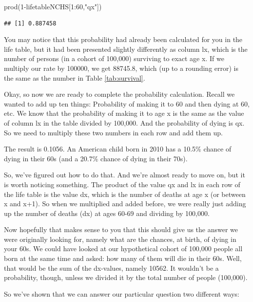 \documentclass[
  openany]{book}
\newenvironment{Shaded}{\begin{snugshade}}{\end{snugshade}}
\newcommand{\DecValTok}[1]{\textcolor[rgb]{0.00,0.00,0.81}{#1}}
\newcommand{\FunctionTok}[1]{\textcolor[rgb]{0.00,0.00,0.00}{#1}}
\newcommand{\NormalTok}[1]{#1}
\newcommand{\SpecialCharTok}[1]{\textcolor[rgb]{0.00,0.00,0.00}{#1}}
\newcommand{\StringTok}[1]{\textcolor[rgb]{0.31,0.60,0.02}{#1}}
\begin{document}
\begin{Shaded}
\begin{Highlighting}[]
\FunctionTok{prod}\NormalTok{(}\DecValTok{1}\SpecialCharTok{{-}}\NormalTok{lifetableNCHS[}\DecValTok{1}\SpecialCharTok{:}\DecValTok{60}\NormalTok{,}\StringTok{"qx"}\NormalTok{])}
\end{Highlighting}
\end{Shaded}

\begin{verbatim}
## [1] 0.887458
\end{verbatim}

You may notice that this probability had already been calculated for you in the life table, but it had been presented slightly differently as column lx, which is the number of persons (in a cohort of 100,000) surviving to exact age x. If we multiply our rate by 100000, we get 88745.8, which (up to a rounding error) is the same as the number in Table \ref{tab:survival}.

Okay, so now we are ready to complete the probability calculation. Recall we wanted to add up ten things: Probability of making it to 60 and then dying at 60, etc. We know that the probability of making it to age x is the same as the value of column lx in the table divided by 100,000. And the probability of dying is qx. So we need to multiply these two numbers in each row and add them up.

The result is 0.1056. An American child born in 2010 has a 10.5\% chance of dying in their 60s (and a 20.7\% chance of dying in their 70s).

So, we've figured out how to do that. And we're almost ready to move on, but it is worth noticing something. The product of the value qx and lx in each row of the life table is the value dx, which is the number of deaths at age x (or between x and x+1). So when we multiplied and added before, we were really just adding up the number of deaths (dx) at ages 60-69 and dividing by 100,000.

Now hopefully that makes sense to you that this should give us the answer we were originally looking for, namely what are the chances, at birth, of dying in your 60s. We could have looked at our hypothetical cohort of 100,000 people all born at the same time and asked: how many of them will die in their 60s. Well, that would be the sum of the dx-values, namely 10562. It wouldn't be a probability, though, unless we divided it by the total number of people (100,000).

So we've shown that we can answer our particular question two different ways:
\end{document}
